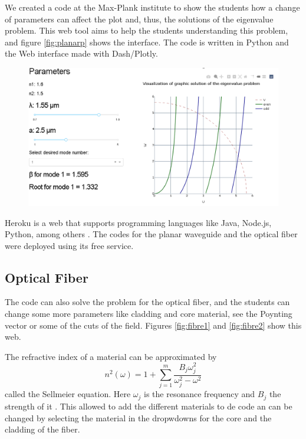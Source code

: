 We created a code at the Max-Plank institute \cite{gitmax} to show the students how a change of parameters can affect the plot and, thus, the solutions of the eigenvalue problem. This web tool aims to help the students understanding this problem, and figure \ref{fig:planarp}  shows the interface. The code is written in Python and the Web interface made with Dash/Plotly.  

\begin{figure}[label={fig:planarp}, caption={\href{https://fiber-mode-app.herokuapp.com/apps/dash_plot}{Heroku app} for the planar waveguide.}]
	\includegraphics[width=.8\textwidth]{figures/chap2/planarpage.png} 
\end{figure}


Heroku is a web that supports programming languages like Java, Node.js, Python, among others \cite{heorku}. The codes for the planar waveguide and the optical fiber were deployed using its free service.

\subsection{Optical Fiber}

The code can also solve the problem for the optical fiber, and the students can change some more parameters like cladding and core material, see the Poynting vector or some of the cuts of the field. Figures \ref{fig:fibre1} and \ref{fig:fibre2} show this web. 


The refractive index of a material can be approximated by 
\begin{equation}
    n^2 (\omega) = 1 + \sum_{j=1}^{m} \frac{B_j\omega^2_j}{\omega^2_j - \omega^2} 
    \label{eq_ene}
\end{equation}
called the Sellmeier equation. Here $\omega_j$ is the resonance frequency and $B_j$ the strength of it \citep{AgrawalBook}. This allowed to add the different materials to de code an can be changed by selecting the material in the dropwdowns for the core and the cladding of the fiber.


